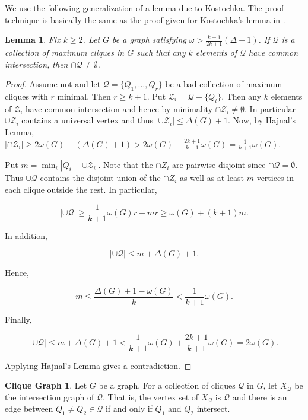 \documentclass[12pt]{article}
\theoremstyle{plain}
\newtheorem{lem}[thm]{Lemma}
\theoremstyle{definition}
\newtheorem*{CliqueGraph}{Clique Graph}
\theoremstyle{remark}
\newcommand{\card}[1]{\left|#1\right|}
\begin{document}
We use the following generalization of a lemma due to Kostochka.  The proof technique is basically the same as the proof given for Kostochka's lemma in \cite{2009arXiv0907.3705R}.
\begin{lem}\label{KostochkaGeneralized}
Fix $k \geq 2$. Let $G$ be a graph satisfying $\omega > \frac{k+1}{2k+1} (\Delta + 1)$.  If $\mathcal{Q}$ is a collection of maximum cliques in $G$ such that any $k$ elements of $\mathcal{Q}$ have common intersection, then $\cap \mathcal{Q} \neq \emptyset$.
\end{lem}
\begin{proof}
Assume not and let $\mathcal{Q} = \{Q_1, \ldots, Q_r\}$ be a bad collection of maximum cliques with $r$ minimal.  Then $r \geq k+1$.  Put $\mathcal{Z}_i = \mathcal{Q} - \{Q_i\}$.  Then any $k$ elements of $\mathcal{Z}_i$ have common intersection and hence by minimality $\cap \mathcal{Z}_i \neq \emptyset$. In particular $\cup \mathcal{Z}_i$ contains a universal vertex and thus $\card{\cup \mathcal{Z}_i} \leq \Delta(G) + 1$. Now, by Hajnal's Lemma, $\card{\cap \mathcal{Z}_i} \geq 2\omega(G) - (\Delta(G) + 1) > 2\omega(G) - \frac{2k+1}{k+1} \omega(G) = \frac{1}{k+1}\omega(G)$.\newline

Put $m = \min_i \card{Q_i - \cup  \mathcal{Z}_i}$.  Note that the $\cap Z_i$ are pairwise disjoint since $\cap \mathcal{Q} = \emptyset$. Thus $\cup \mathcal{Q}$ contains the disjoint union of the $\cap Z_i$ as well as at least $m$ vertices in each clique outside the rest. In particular,

\[\card{\cup \mathcal{Q}} \geq \frac{1}{k+1}\omega(G) r + mr \geq \omega(G) + (k+1)m.\]

In addition, 

\[\card{\cup \mathcal{Q}} \leq m + \Delta(G) + 1.\]

Hence,

\[m \leq \frac{\Delta(G) + 1 - \omega(G)}{k} < \frac{1}{k+1}\omega(G).\]

Finally,

\[\card{\cup \mathcal{Q}} \leq m + \Delta(G) + 1 < \frac{1}{k+1}\omega(G) + \frac{2k+1}{k+1}\omega(G) = 2\omega(G).\]

Applying Hajnal's Lemma gives a contradiction.
\end{proof}
\begin{CliqueGraph}
Let $G$ be a graph. For a collection of cliques $\mathcal{Q}$ in $G$, let $X_{\mathcal{Q}}$ be the intersection graph of $\mathcal{Q}$.  That is, the vertex set of $X_{\mathcal{Q}}$ is $\mathcal{Q}$ and there is an edge between $Q_1 \neq Q_2 \in \mathcal{Q}$ if and only if $Q_1$ and $Q_2$ intersect.
\end{CliqueGraph}
\end{document}
